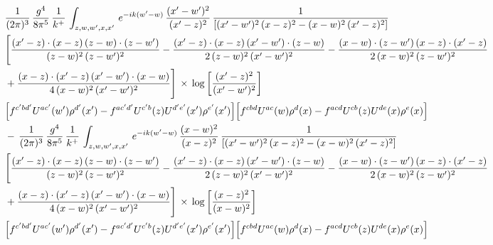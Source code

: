 \documentclass[9pt]{article}
\numberwithin{equation}{section}
\begin{document}
\begin{align}
&  \frac{1}{(2\pi)^{3}}\, \frac{g^{4}}{8\pi^{5}}\,\frac{1}{k^{+}}\,\int_{z,w,w^{\prime},x,x'}\, e^{-ik(w^{\prime}-w)}\,\frac{(x'-w')^{2}}{(x'-z)^{2}}\, \frac{1}{\left[(x'-w')^{2}\, (x-z)^{2} - (x-w)^{2}\, (x'-z)^{2}\right]} \notag \\ & \Bigg[\frac{(x'-z)\cdot (x-z)\, (z-w)\cdot (z-w')}{(z-w)^{2}\, (z-w')^{2}}-\frac{(x'-z)\cdot (x-z)\, (x'-w')\cdot (z-w)}{2\, (z-w)^{2}\, (x'-w')^{2}} -\frac{(x-w)\cdot (z-w')\, (x-z)\cdot (x'-z)}{2\, (x-w)^{2}\, (z-w')^{2}}\notag \\ & +\frac{(x-z)\cdot (x'-z)\, (x'-w')\cdot (x-w)}{4\, (x-w)^{2}\, (x'-w')^{2}}\Bigg]\,\times\, \log{\left[\frac{(x'-z)^{2}}{(x'-w')^{2}}\right]} \notag \\ &  \Big[f^{c'bd'}U^{ac'}(w')\rho^{d'}(x')-f^{ac'd'}U^{c'b}(z)U^{d'e'}(x')\rho^{e'}(x')\Big]\Big[f^{cbd}U^{ac}(w)\rho^{d}(x)-f^{acd}U^{cb}(z)U^{de}(x)\rho^{e}(x)\Big] \notag \\ & -\,\frac{1}{(2\pi)^{3}}\, \frac{g^{4}}{8\pi^{5}}\,\frac{1}{k^{+}}\,\int_{z,w,w^{\prime},x,x'}\, e^{-ik(w^{\prime}-w)}\,\frac{(x-w)^{2}}{(x-z)^{2}}\, \frac{1}{\left[(x'-w')^{2}\, (x-z)^{2} - (x-w)^{2}\, (x'-z)^{2}\right]} \notag \\ & \Bigg[\frac{(x'-z)\cdot (x-z)\, (z-w)\cdot (z-w')}{(z-w)^{2}\, (z-w')^{2}}-\frac{(x'-z)\cdot (x-z)\, (x'-w')\cdot (z-w)}{2\, (z-w)^{2}\, (x'-w')^{2}} -\frac{(x-w)\cdot (z-w')\, (x-z)\cdot (x'-z)}{2\, (x-w)^{2}\, (z-w')^{2}}\notag \\ & +\frac{(x-z)\cdot (x'-z)\, (x'-w')\cdot (x-w)}{4\, (x-w)^{2}\, (x'-w')^{2}}\Bigg]\,\times\, \log{\left[\frac{(x-z)^{2}}{(x-w)^{2}}\right]} \notag \\ &  \Big[f^{c'bd'}U^{ac'}(w')\rho^{d'}(x')-f^{ac'd'}U^{c'b}(z)U^{d'e'}(x')\rho^{e'}(x')\Big]\Big[f^{cbd}U^{ac}(w)\rho^{d}(x)-f^{acd}U^{cb}(z)U^{de}(x)\rho^{e}(x)\Big]
\end{align}
\end{document}
